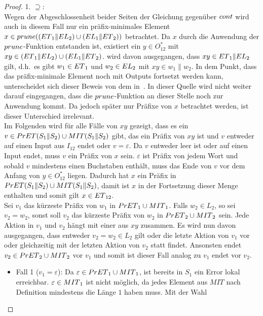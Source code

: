 \begin{proof}
  1. \glqq $\supseteq$\grqq :\\
  Wegen der Abgeschlossenheit beider Seiten der Gleichung gegenüber $cont{}$
  wird auch in diesem Fall nur ein präfix-minimales Element $x\in
  prune{}((ET{}_1\|EL{}_2)\cup (EL{}_1\|ET{}_2))$ betrachtet. Da $x$ durch
  die Anwendung der $prune{}$-Funktion entstanden ist, existiert ein $y\in
  O_{12}^*$ mit $xy\in(ET{}_1\|EL{}_2)\cup (EL{}_1\|ET{}_2)$. \OBdA{} wird
  davon ausgegangen, dass
  $xy\in ET{}_1\|EL{}_2$ gilt, d.h.\ es gibt $w_1\in ET{}_1$ und $w_2\in EL{}_2$ mit
  $xy\in w_1\|w_2$. In dem Punkt, dass das präfix-minimale Element noch mit
  Outputs fortsetzt werden kann, unterscheidet sich dieser Beweis von dem
  in~\cite{Schlosser2012BA}. In dieser Quelle wird nicht weiter darauf eingegangen, dass
  die $prune{}$-Funktion an dieser Stelle noch zur Anwendung kommt. Da jedoch später nur
  Präfixe von $x$ betrachtet werden, ist dieser Unterschied irrelevant.\\
  Im Folgenden wird für alle Fälle von $xy$ gezeigt, dass es ein $v\in
  PrET{}(S_1\|S_2)\cup MIT{}(S_1\|S_2)$ gibt, das ein Präfix von $xy$ ist und $v$
  entweder auf einen Input aus $I_{12}$ endet oder $v = \varepsilon$. Da $v$
  entweder leer ist oder auf einen Input endet, muss $v$ ein Präfix von $x$
  sein. $\varepsilon$ ist Präfix von jedem Wort und sobald $v$ mindestens einen
  Buchstaben enthält, muss das Ende von $v$ vor dem Anfang von $y\in O_{12}^*$
  liegen. Dadurch hat $x$ ein Präfix in $PrET{}(S_1\|S_2)\cup
  MIT{}(S_1\|S_2)$, damit ist $x$ in
  der Fortsetzung dieser Menge enthalten und somit gilt $x\in ET{}_{12}$.\\
  Sei $v_1$ das kürzeste Präfix von $w_1$ in $PrET{}_1\cup MIT{}_1$. Falls
  $w_2\in L_2$, so sei $v_2=w_2$, sonst soll $v_2$ das kürzeste Präfix von
  $w_2$ in $PrET{}_2\cup MIT{}_2$ sein. Jede Aktion in $v_1$ und $v_2$ hängt mit
  einer aus $xy$ zusammen. Es wird nun davon ausgegangen, dass entweder
  $v_2=w_2\in L_2$ gilt oder die letzte Aktion von $v_1$ vor oder
  gleichzeitig mit der letzten Aktion von $v_2$ statt findet. Ansonsten endet
  $v_2\in PrET{}_2\cup MIT{}_2$ vor $v_1$ und somit ist dieser Fall analog zu $v_1$
  endet vor $v_2$.
  \begin{itemize}
    \item Fall 1 ($v_1=\varepsilon$): Da $\varepsilon\in PrET{}_1\cup
      MIT{}_1$, ist bereits in $S_1$ ein Error lokal erreichbar. $\varepsilon\in
      MIT{}_1$ ist nicht möglich, da jedes Element aus $MIT$ nach Definition
      mindestens die Länge $1$ haben muss. Mit der Wahl

\end{itemize}
\end{proof}
